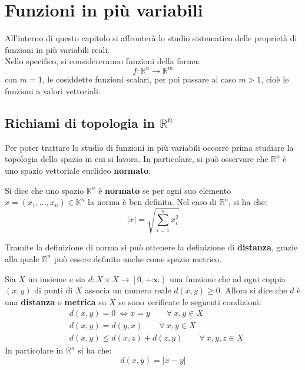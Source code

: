 \chapter{Funzioni in più variabili}
All'interno di questo capitolo si affronterà lo studio sistematico delle proprietà di funzioni in più variabili reali.\\
Nello specifico, si considereranno funzioni della forma: 
\begin{equation*}
    f:\mathbb{R}^n \to \mathbb{R}^m
\end{equation*}
con $m=1$, le cosiddette funzioni scalari, per poi passare al caso $m>1$, cioè le funzioni a valori vettoriali.
\section{Richiami di topologia in $\mathbb{R}^n$}
Per poter trattare lo studio di funzioni in più variabili occorre prima studiare la topologia dello spazio in cui si lavora.
In particolare, si può osservare che $\mathbb{R}^n$ è uno spazio vettoriale euclideo \textbf{normato}.
\begin{definition}
    Si dice che uno spazio $\mathbb{K}^n$ è \textbf{normato} se per ogni suo elemento $x=(x_1,\dots,x_n) \in \mathbb{K}^n$ la norma è ben definita. Nel caso di $\mathbb{R}^n$, si ha che:
    \begin{equation*}
        |x|=\sqrt{\sum\limits_{i=1}^{n}{x_i^2}}
    \end{equation*}
\end{definition}
Tramite la definizione di norma si può ottenere la definizione di \textbf{distanza}, grazie alla quale $\mathbb{R}^n$ può essere definito anche come spazio metrico.
\begin{definition} \label{Def: Distanza}
    Sia $X$ un insieme e sia $d:X \times X \to \left[0, +\infty \right)$ una funzione che ad ogni coppia $(x,y)$ di punti di $X$ associa un numero reale $d(x,y)\geq0$. Allora si dice che $d$ è una \textbf{distanza} o \textbf{metrica} su $X$ se sono verificate le seguenti condizioni:
    \begin{align}
        &d(x,y)=0 \ \iff x=y \qquad\forall\ x,y \in X \\
        &d(x,y)=d(y,x) \qquad \forall\ x,y \in X \\
        &d(x,y) \leq d(x,z) + d(z, y) \qquad \forall\ x,y,z \in X
    \end{align}
    In particolare in $\mathbb{R}^n$ si ha che:
    \begin{equation*}
        d(x, y)=|x-y|
    \end{equation*}
\end{definition}
